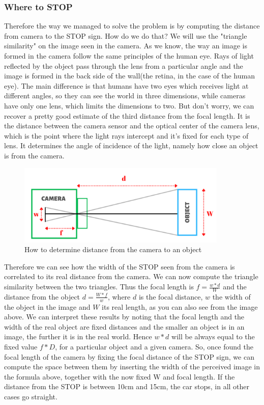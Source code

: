 \documentclass[12pt,a4paper]{article}
\begin{document}
\begin{large}
\subsubsection*{Where to STOP}
Therefore the way we managed to solve the problem is by computing the distance from camera to the STOP sign. How do we do that? We will use the "triangle similarity" on the image seen in the camera. As we know, the way an image is formed in the camera follow the same principles of the human eye. Rays of light reflected by the object pass through the lens  from a particular angle and the image is formed in the back side of the wall(the retina, in the case of the human eye). The main difference is that humans have two eyes which receives light at different angles, so they can see the world in three dimensions, while cameras have only one lens, which limits the dimensions to two. But don't worry, we can recover a pretty good estimate of the third distance from the focal length. It is the distance between the camera sensor and the optical center of the camera lens, which is the point where the light rays intercept and it's fixed for each type of lens. It determines the angle of incidence of the light, namely how close an object is from the camera.

\begin{figure} [!h]
  \centering
  \captionsetup{justification=centering}
  \includegraphics[width=10cm]{images/3D_distance.png}
  \caption{How to determine distance from the camera to an object}
  \end{figure}

Therefore we can see how the width of the STOP seen from the camera is correlated to its real distance from the camera. We can now compute the triangle similarity between the two triangles. Thus the focal length is $f = \frac{w * d}{W}$ and the distance from the object $d = \frac{W * f}{w}$, where $d$ is the focal distance, $w$ the width of the object in the image and $W$ its real length, as you can also see from the image above. We can interpret these results by noting that the focal length and the width of the real object are fixed distances and the smaller an object is in an image, the further it is in the real world. Hence $w*d$ will be always equal to the fixed value $f*D$, for a particular object and a given camera.
So, once found the focal length of the camera by fixing the focal distance of the STOP sign, we can compute the space between them by inserting the width of the perceived image in the formula above, together with the now fixed W and focal length. If the distance from the STOP is between 10cm and 15cm, the car stops, in all other cases go straight.



\end{large}
\end{document}
